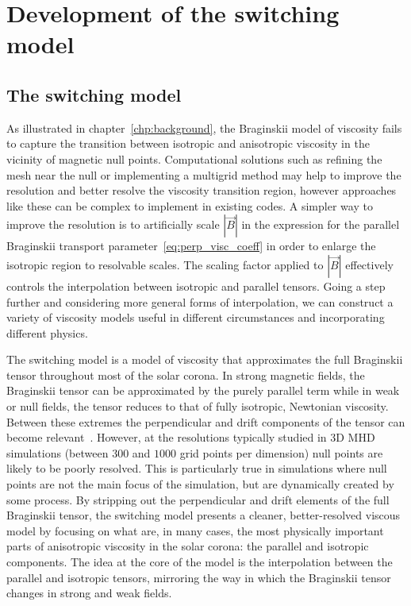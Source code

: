 \chapter{Development of the switching model}
\label{chp:switching_model}

\section{The switching model}

As illustrated in chapter~\ref{chp:background}, the Braginskii model of viscosity fails to capture the transition between isotropic and anisotropic viscosity in the vicinity of magnetic null points. Computational solutions such as refining the mesh near the null or implementing a multigrid method may help to improve the resolution and better resolve the viscosity transition region, however approaches like these can be complex to implement in existing codes. A simpler way to improve the resolution is to artificially scale $|\vec{B}|$ in the expression for the parallel Braginskii transport parameter~\ref{eq:perp_visc_coeff} in order to enlarge the isotropic region to resolvable scales. The scaling factor applied to $|\vec{B}|$ effectively controls the interpolation between isotropic and parallel tensors. Going a step further and considering more general forms of interpolation, we can construct a variety of viscosity models useful in different circumstances and incorporating different physics.

The switching model is a model of viscosity that approximates the full Braginskii tensor throughout most of the solar corona. In strong magnetic fields, the Braginskii tensor can be approximated by the purely parallel term while in weak or null fields, the tensor reduces to that of fully isotropic, Newtonian viscosity. Between these extremes the perpendicular and drift components of the tensor can become relevant~\cite{erdelyiResonantAbsorptionAlfven1995a}. However, at the resolutions typically studied in 3D MHD simulations (between $300$ and $1000$ grid points per dimension) null points are likely to be poorly resolved. This is particularly true in simulations where null points are not the main focus of the simulation, but are dynamically created by some process. By stripping out the perpendicular and drift elements of the full Braginskii tensor, the switching model presents a cleaner, better-resolved viscous model by focusing on what are, in many cases, the most physically important parts of anisotropic viscosity in the solar corona: the parallel and isotropic components. The idea at the core of the model is the interpolation between the parallel and isotropic tensors, mirroring the way in which the Braginskii tensor changes in strong and weak fields.

